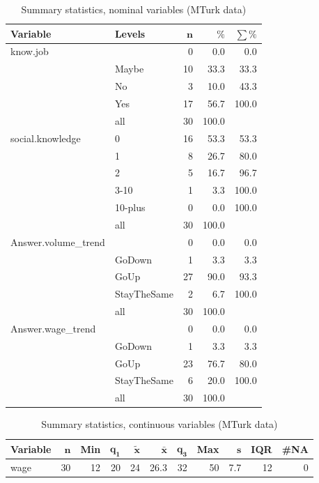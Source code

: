 \documentclass[a4paper,10pt]{article}\usepackage[]{graphicx}\usepackage[]{color}
\begin{document}
\begin{table}[ht]
\centering
{\footnotesize
\begin{tabular}{ll|rrr}
 \textbf{Variable} & \textbf{Levels} & $\mathbf{n}$ & $\mathbf{\%}$ & $\mathbf{\sum \%}$ \\ 
  \hline
know.job &  & 0 & 0.0 & 0.0 \\ 
   & Maybe & 10 & 33.3 & 33.3 \\ 
   & No & 3 & 10.0 & 43.3 \\ 
   & Yes & 17 & 56.7 & 100.0 \\ 
   \hline
 & all & 30 & 100.0 &  \\ 
   \hline
\hline
social.knowledge & 0 & 16 & 53.3 & 53.3 \\ 
   & 1 & 8 & 26.7 & 80.0 \\ 
   & 2 & 5 & 16.7 & 96.7 \\ 
   & 3-10 & 1 & 3.3 & 100.0 \\ 
   & 10-plus & 0 & 0.0 & 100.0 \\ 
   \hline
 & all & 30 & 100.0 &  \\ 
   \hline
\hline
Answer.volume\_trend &  & 0 & 0.0 & 0.0 \\ 
   & GoDown & 1 & 3.3 & 3.3 \\ 
   & GoUp & 27 & 90.0 & 93.3 \\ 
   & StayTheSame & 2 & 6.7 & 100.0 \\ 
   \hline
 & all & 30 & 100.0 &  \\ 
   \hline
\hline
Answer.wage\_trend &  & 0 & 0.0 & 0.0 \\ 
   & GoDown & 1 & 3.3 & 3.3 \\ 
   & GoUp & 23 & 76.7 & 80.0 \\ 
   & StayTheSame & 6 & 20.0 & 100.0 \\ 
   \hline
 & all & 30 & 100.0 &  \\ 
   \hline
\hline
\end{tabular}
}
\caption{Summary statistics, nominal variables (MTurk data)} 
\label{tab1:15-1140}
\end{table}
\begin{table}[ht]
\centering
{\footnotesize
\begin{tabular}{lrrrrrrrrrr}
 \textbf{Variable} & $\mathbf{n}$ & \textbf{Min} & $\mathbf{q_1}$ & $\mathbf{\widetilde{x}}$ & $\mathbf{\bar{x}}$ & $\mathbf{q_3}$ & \textbf{Max} & $\mathbf{s}$ & \textbf{IQR} & \textbf{\#NA} \\ 
  \hline
wage & 30 & 12 & 20 & 24 & 26.3 & 32 & 50 & 7.7 & 12 & 0 \\ 
  \end{tabular}
}
\caption{Summary statistics, continuous variables (MTurk data)} 
\label{tab2:15-1140}
\end{table}
\end{document}
